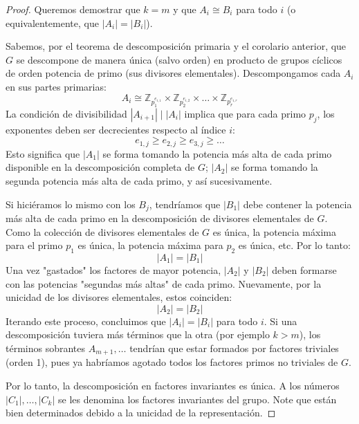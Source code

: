 \begin{proof}
Queremos demostrar que $k=m$ y que $A_i \cong B_i$ para todo $i$ (o equivalentemente, que $|A_i| = |B_i|$).

Sabemos, por el teorema de descomposición primaria y el corolario anterior, que $G$ se descompone de manera única (salvo orden) en producto de grupos cíclicos de orden potencia de primo (sus divisores elementales).
Descompongamos cada $A_i$ en sus partes primarias:
\begin{equation*}
A_i \cong \mathbb{Z}_{p_1^{e_{i,1}}} \times \mathbb{Z}_{p_2^{e_{i,2}}} \times \dots \times \mathbb{Z}_{p_r^{e_{i,r}}}
\end{equation*}
La condición de divisibilidad $|A_{i+1}| \mid |A_i|$ implica que para cada primo $p_j$, los exponentes deben ser decrecientes respecto al índice $i$:
\begin{equation*}
e_{1,j} \ge e_{2,j} \ge e_{3,j} \ge \dots
\end{equation*}
Esto significa que $|A_1|$ se forma tomando la potencia más alta de cada primo disponible en la descomposición completa de $G$; $|A_2|$ se forma tomando la segunda potencia más alta de cada primo, y así sucesivamente.

Si hiciéramos lo mismo con los $B_j$, tendríamos que $|B_1|$ debe contener la potencia más alta de cada primo en la descomposición de divisores elementales de $G$.
Como la colección de divisores elementales de $G$ es única, la potencia máxima para el primo $p_1$ es única, la potencia máxima para $p_2$ es única, etc.
Por lo tanto:
\begin{equation*}
|A_1| = |B_1|
\end{equation*}
Una vez "gastados" los factores de mayor potencia, $|A_2|$ y $|B_2|$ deben formarse con las potencias "segundas más altas" de cada primo. Nuevamente, por la unicidad de los divisores elementales, estos coinciden:
\begin{equation*}
|A_2| = |B_2|
\end{equation*}
Iterando este proceso, concluimos que $|A_i| = |B_i|$ para todo $i$.
Si una descomposición tuviera más términos que la otra (por ejemplo $k > m$), los términos sobrantes $A_{m+1}, \dots$ tendrían que estar formados por factores triviales (orden 1), pues ya habríamos agotado todos los factores primos no triviales de $G$.

Por lo tanto, la descomposición en factores invariantes es única. A los números $|C_1|, \dots, |C_k|$ se les denomina los factores invariantes del grupo. Note que están bien determinados debido a la unicidad de la representación.

\end{proof}

